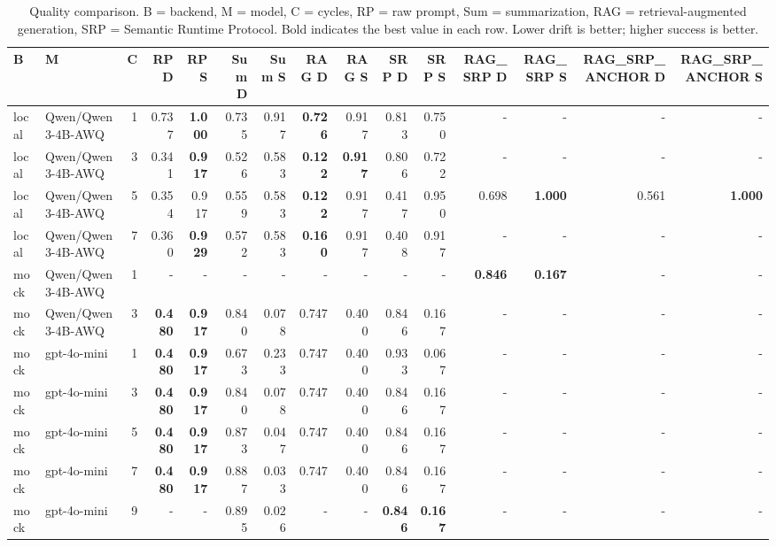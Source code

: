 \begin{table}[t]
\centering
\setlength{\tabcolsep}{3pt}
\scriptsize
\begin{tabular}{llrrrrrrrrrrrrr}
\toprule
B & M & C & RP D & RP S & Sum D & Sum S & RAG D & RAG S & SRP D & SRP S & RAG_SRP D & RAG_SRP S & RAG_SRP_ANCHOR D & RAG_SRP_ANCHOR S \\
\midrule
local & Qwen/Qwen3-4B-AWQ & 1 & 0.737 & \textbf{1.000} & 0.735 & 0.917 & \textbf{0.726} & 0.917 & 0.813 & 0.750 & - & - & - & - \\
local & Qwen/Qwen3-4B-AWQ & 3 & 0.341 & \textbf{0.917} & 0.526 & 0.583 & \textbf{0.122} & \textbf{0.917} & 0.806 & 0.722 & - & - & - & - \\
local & Qwen/Qwen3-4B-AWQ & 5 & 0.354 & 0.917 & 0.559 & 0.583 & \textbf{0.122} & 0.917 & 0.417 & 0.950 & 0.698 & \textbf{1.000} & 0.561 & \textbf{1.000} \\
local & Qwen/Qwen3-4B-AWQ & 7 & 0.360 & \textbf{0.929} & 0.572 & 0.583 & \textbf{0.160} & 0.917 & 0.408 & 0.917 & - & - & - & - \\
mock & Qwen/Qwen3-4B-AWQ & 1 & - & - & - & - & - & - & - & - & \textbf{0.846} & \textbf{0.167} & - & - \\
mock & Qwen/Qwen3-4B-AWQ & 3 & \textbf{0.480} & \textbf{0.917} & 0.840 & 0.078 & 0.747 & 0.400 & 0.846 & 0.167 & - & - & - & - \\
mock & gpt-4o-mini & 1 & \textbf{0.480} & \textbf{0.917} & 0.673 & 0.233 & 0.747 & 0.400 & 0.933 & 0.067 & - & - & - & - \\
mock & gpt-4o-mini & 3 & \textbf{0.480} & \textbf{0.917} & 0.840 & 0.078 & 0.747 & 0.400 & 0.846 & 0.167 & - & - & - & - \\
mock & gpt-4o-mini & 5 & \textbf{0.480} & \textbf{0.917} & 0.873 & 0.047 & 0.747 & 0.400 & 0.846 & 0.167 & - & - & - & - \\
mock & gpt-4o-mini & 7 & \textbf{0.480} & \textbf{0.917} & 0.887 & 0.033 & 0.747 & 0.400 & 0.846 & 0.167 & - & - & - & - \\
mock & gpt-4o-mini & 9 & - & - & 0.895 & 0.026 & - & - & \textbf{0.846} & \textbf{0.167} & - & - & - & - \\
\bottomrule
\end{tabular}
\caption{Quality comparison. B = backend, M = model, C = cycles, RP = raw prompt, Sum = summarization, RAG = retrieval-augmented generation, SRP = Semantic Runtime Protocol. Bold indicates the best value in each row. Lower drift is better; higher success is better.}
\label{tab:srp-quality-table}
\end{table}
